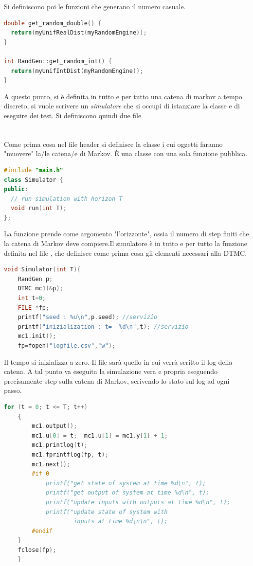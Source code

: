 \documentclass[10pt, letterpaper]{report}
\begin{document}
Si definiscono poi le funzioni che generano il numero casuale.
\begin{lstlisting}[style=CppStyle,language=C++]
double get_random_double() {
  return(myUnifRealDist(myRandomEngine));
} 

int RandGen::get_random_int() {
  return(myUnifIntDist(myRandomEngine));
} 
\end{lstlisting}
A questo punto, si è definita in tutto e per tutto una catena di markov a tempo discreto, si vuole scrivere un \textit{simulatore} che si occupi di istanziare la classe e di eseguire dei test. Si definiscono quindi due file\\
\\ 
\\
Come prima cosa nel file header si definisce la classe  i cui oggetti faranno "muovere" la/le catena/e di Markov. È una classe con una sola funzione pubblica.
\begin{lstlisting}[style=CppStyle,language=C++]
#include "main.h"
class Simulator {
public:
  // run simulation with horizon T
  void run(int T);
};
\end{lstlisting}
La funzione  prende come argomento "l'orizzonte", ossia il numero di step finiti che la catena di Markov deve compiere.\acc  Il simulatore è in tutto e per tutto la funzione  definita nel file , che definisce come prima cosa gli elementi necessari alla DTMC.
\begin{lstlisting}[style=CppStyle,language=C++]
void Simulator(int T){
    RandGen p; 
    DTMC mc1(&p);
    int t=0;
    FILE *fp;
    printf("seed : %u\n",p.seed); //servizio
    printf("inizialization : t=  %d\n",t); //servizio
    mc1.init();
    fp=fopen("logfile.csv","w");
\end{lstlisting}
Il tempo  si inizializza a zero. Il file  sarà quello in cui verrà scritto il log della catena. A tal punto va eseguita la simulazione vera e propria eseguendo precisamente  step sulla catena di Markov, scrivendo lo stato sul log ad ogni passo.
\begin{lstlisting}[style=CppStyle,language=C++]
    for (t = 0; t <= T; t++)
    {
        mc1.output();
        mc1.u[0] = t;  mc1.u[1] = mc1.y[1] + 1;
        mc1.printlog(t);
        mc1.fprintflog(fp, t);
        mc1.next(); 
        #if 0
            printf("get state of system at time %d\n", t);
            printf("get output of system at time %d\n", t);
            printf("update inputs with outputs at time %d\n", t);
            printf("update state of system with
                    inputs at time %d\n\n", t);
        #endif  
    }  
    fclose(fp);
    }  
\end{lstlisting}
\end{document}
